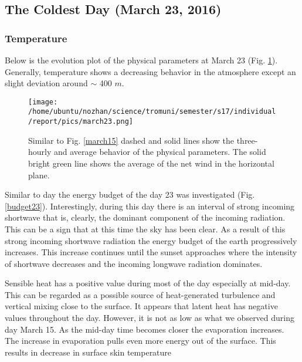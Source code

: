 \documentclass[a4paper,12pt]{article}
\numberwithin{equation}{section} %
\begin{document}

\subsection{The Coldest Day (March 23, 2016)}

\subsubsection{Temperature}

Below is the evolution plot of the physical parameters at March 23 (Fig. \ref{march23}). Generally, temperature shows a decreasing behavior in the atmosphere except an slight deviation around $\sim$ 400 $m$.

\begin{figure}[bhp]
\texttt{[image: /home/ubuntu/nozhan/science/tromuni/semester/s17/individual/report/pics/march23.png]}
\caption{Similar to Fig. \ref{march15} dashed and solid lines show the three-hourly and average behavior of the physical parameters. The solid bright green line shows the average of the net wind in the horizontal plane.}
\label{march23}
\end{figure}

\vspace{0.5cm}

Similar to day  the energy budget of the day 23 was investigated (Fig. \ref{budget23}). Interestingly, during this day there is an interval of strong incoming shortwave that is, clearly, the dominant component of the incoming radiation. This can be a sign that at this time the sky has been clear. As a result of this strong incoming shortwave radiation the energy budget of the earth progressively increases. This increase continues until the sunset approaches where the intensity of shortwave decreases and the incoming longwave radiation dominates. 

Sensible heat has a positive value during most of the day especially at mid-day. This can be regarded as a possible source of heat-generated turbulence and vertical mixing close to the surface. It appears that latent heat has negative values throughout the day. However, it is not as low as what we observed during day March 15. As the mid-day time becomes closer the evaporation increases. The increase in evaporation pulls even more energy out of the surface. This results in decrease in surface skin temperature 
\end{document}
